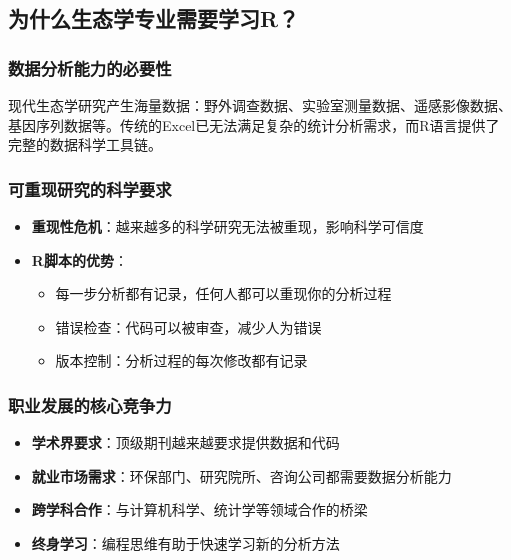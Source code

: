 \documentclass[
]{book}
\providecommand{\tightlist}{%
  \setlength{\itemsep}{0pt}\setlength{\parskip}{0pt}}
\begin{document}
\hypertarget{ux4e3aux4ec0ux4e48ux751fux6001ux5b66ux4e13ux4e1aux9700ux8981ux5b66ux4e60r}{%
\subsection{为什么生态学专业需要学习R？}\label{ux4e3aux4ec0ux4e48ux751fux6001ux5b66ux4e13ux4e1aux9700ux8981ux5b66ux4e60r}}

\hypertarget{ux6570ux636eux5206ux6790ux80fdux529bux7684ux5fc5ux8981ux6027}{%
\subsubsection{数据分析能力的必要性}\label{ux6570ux636eux5206ux6790ux80fdux529bux7684ux5fc5ux8981ux6027}}

现代生态学研究产生海量数据：野外调查数据、实验室测量数据、遥感影像数据、基因序列数据等。传统的Excel已无法满足复杂的统计分析需求，而R语言提供了完整的数据科学工具链。

\hypertarget{ux53efux91cdux73b0ux7814ux7a76ux7684ux79d1ux5b66ux8981ux6c42}{%
\subsubsection{可重现研究的科学要求}\label{ux53efux91cdux73b0ux7814ux7a76ux7684ux79d1ux5b66ux8981ux6c42}}

\begin{itemize}
\tightlist
\item
  \textbf{重现性危机}：越来越多的科学研究无法被重现，影响科学可信度
\item
  \textbf{R脚本的优势}：

  \begin{itemize}
  \tightlist
  \item
    每一步分析都有记录，任何人都可以重现你的分析过程
  \item
    错误检查：代码可以被审查，减少人为错误
  \item
    版本控制：分析过程的每次修改都有记录
  \end{itemize}
\end{itemize}

\hypertarget{ux804cux4e1aux53d1ux5c55ux7684ux6838ux5fc3ux7adeux4e89ux529b}{%
\subsubsection{职业发展的核心竞争力}\label{ux804cux4e1aux53d1ux5c55ux7684ux6838ux5fc3ux7adeux4e89ux529b}}

\begin{itemize}
\tightlist
\item
  \textbf{学术界要求}：顶级期刊越来越要求提供数据和代码
\item
  \textbf{就业市场需求}：环保部门、研究院所、咨询公司都需要数据分析能力
\item
  \textbf{跨学科合作}：与计算机科学、统计学等领域合作的桥梁
\item
  \textbf{终身学习}：编程思维有助于快速学习新的分析方法
\end{itemize}
\end{document}
